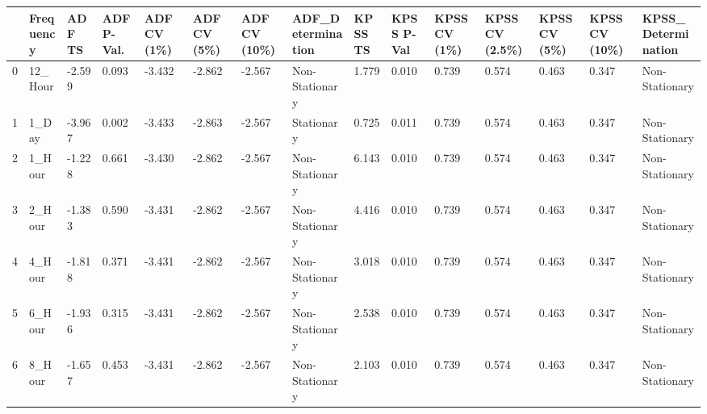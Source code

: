 \begin{tabular}{lllllllllllllll}
\toprule
 & Frequency & ADF TS & ADF P-Val. & ADF CV (1\%) & ADF CV (5\%) & ADF CV (10\%) & ADF_Determination & KPSS TS & KPSS P-Val & KPSS CV (1\%) & KPSS CV (2.5\%) & KPSS CV (5\%) & KPSS CV (10\%) & KPSS_Determination \\
\midrule
0 & 12_Hour & -2.599 & 0.093 & -3.432 & -2.862 & -2.567 & Non-Stationary & 1.779 & 0.010 & 0.739 & 0.574 & 0.463 & 0.347 & Non-Stationary \\
1 & 1_Day & -3.967 & 0.002 & -3.433 & -2.863 & -2.567 & Stationary & 0.725 & 0.011 & 0.739 & 0.574 & 0.463 & 0.347 & Non-Stationary \\
2 & 1_Hour & -1.228 & 0.661 & -3.430 & -2.862 & -2.567 & Non-Stationary & 6.143 & 0.010 & 0.739 & 0.574 & 0.463 & 0.347 & Non-Stationary \\
3 & 2_Hour & -1.383 & 0.590 & -3.431 & -2.862 & -2.567 & Non-Stationary & 4.416 & 0.010 & 0.739 & 0.574 & 0.463 & 0.347 & Non-Stationary \\
4 & 4_Hour & -1.818 & 0.371 & -3.431 & -2.862 & -2.567 & Non-Stationary & 3.018 & 0.010 & 0.739 & 0.574 & 0.463 & 0.347 & Non-Stationary \\
5 & 6_Hour & -1.936 & 0.315 & -3.431 & -2.862 & -2.567 & Non-Stationary & 2.538 & 0.010 & 0.739 & 0.574 & 0.463 & 0.347 & Non-Stationary \\
6 & 8_Hour & -1.657 & 0.453 & -3.431 & -2.862 & -2.567 & Non-Stationary & 2.103 & 0.010 & 0.739 & 0.574 & 0.463 & 0.347 & Non-Stationary \\
\bottomrule
\end{tabular}

